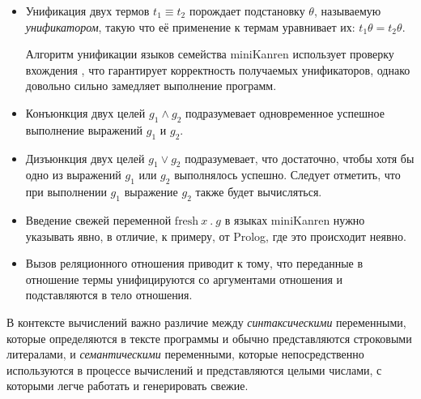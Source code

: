 \begin{itemize}
\item Унификация двух термов $t_1 \equiv t_2$ порождает подстановку $\theta$, называемую \emph{унификатором},
      такую что её применение к термам уравнивает их: $t_1 \theta = t_2 \theta$.

      Алгоритм унификации языков семейства miniKanren использует проверку вхождения ,
      что гарантирует корректность получаемых унификаторов, однако довольно сильно замедляет выполнение программ.

\item Конъюнкция двух целей $g_1 \land g_2$ подразумевает одновременное успешное выполнение выражений $g_1$ и $g_2$.
\item Дизъюнкция двух целей $g_1 \lor g_2$ подразумевает, что достаточно, чтобы хотя бы одно из выражений $g_1$ или $g_2$ выполнялось успешно.
      Следует отметить, что при выполнении $g_1$ выражение $g_2$ также будет вычисляться.
\item Введение свежей переменной $\text{fresh}\ x\ .\ g$ в языках miniKanren нужно указывать явно, в отличие, к примеру,
      от Prolog, где это происходит неявно.
\item Вызов реляционного отношения приводит к тому, что переданные в отношение термы
      унифицируются со аргументами отношения и подставляются в тело отношения. 
\end{itemize}

В контексте вычислений важно различие между \emph{синтаксическими} переменными, которые
определяются в тексте программы и обычно представляются строковыми литералами, и
\emph{семантическими} переменными, которые непосредственно используются в процессе вычислений и
представляются целыми числами, с которыми легче работать и генерировать свежие.




